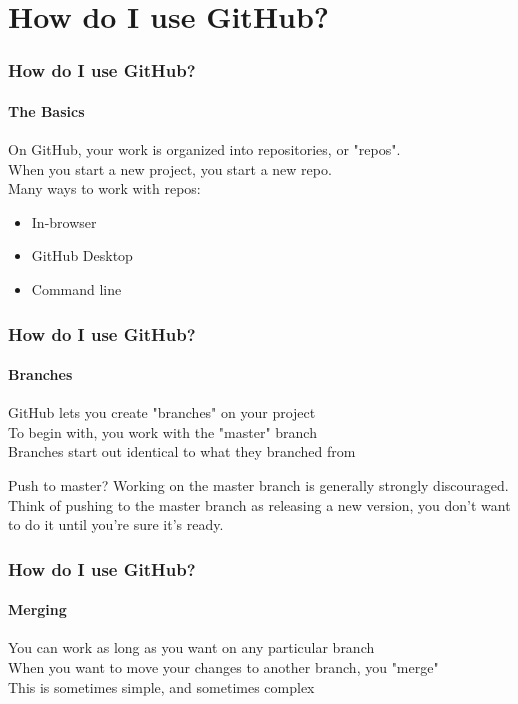 \documentclass{beamer}
\begin{document}
\section{How do I use GitHub?} %
\begin{frame}
  \frametitle{How do I use GitHub?}
  \framesubtitle{The Basics}
  On GitHub, your work is organized into repositories, or "repos".\\\pause\vspace{0.25em}
  When you start a new project, you start a new repo.\\\pause\vspace{0.25em}
  Many ways to work with repos:
  \begin{itemize}[<+->]
    \item In-browser
    \item GitHub Desktop
    \item Command line
  \end{itemize}
\end{frame}

\begin{frame}
  \frametitle{How do I use GitHub?}
  \framesubtitle{Branches}
  GitHub lets you create "branches" on your project\\\pause\vspace{0.25em}
  To begin with, you work with the "master" branch\\\pause\vspace{0.25em}
  Branches start out identical to what they branched from\\\pause\vspace{0.25em}

  \begin{alertblock}{Push to master?}
    Working on the master branch is generally strongly discouraged. Think of pushing to the master branch as releasing a new version, you don't want to do it until you're sure it's ready.
  \end{alertblock}
\end{frame}

\begin{frame}
  \frametitle{How do I use GitHub?}
  \framesubtitle{Merging}
  You can work as long as you want on any particular branch\\\pause\vspace{0.25em}
  When you want to move your changes to another branch, you "merge"\\\pause\vspace{0.25em}
  This is sometimes simple, and sometimes complex\\\vspace{0.25em}
\end{frame}
\end{document}
